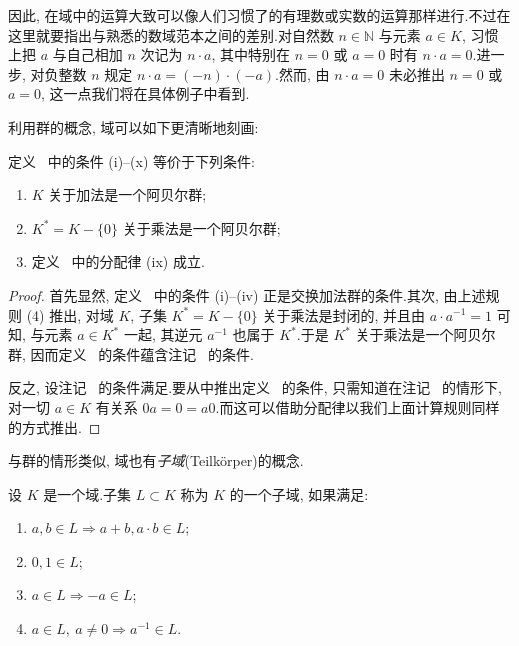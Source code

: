 因此, 在域中的运算大致可以像人们习惯了的有理数或实数的运算那样进行.不过在这里就要指出与熟悉的数域范本之间的差别.对自然数 $n \in \mathbb{N}$ 与元素 $a \in K$, 习惯上把 $a$ 与自己相加 $n$ 次记为 $n \cdot a$, 其中特别在 $n = 0$ 或 $a = 0$ 时有 $n \cdot a = 0$.进一步, 对负整数 $n$ 规定 $n \cdot a = (-n) \cdot (-a)$.然而, 由 $n \cdot a = 0$ 未必推出 $n = 0$ 或 $a = 0$, 这一点我们将在具体例子中看到.

利用群的概念, 域可以如下更清晰地刻画:

\begin{remark}[域的刻画]\label{rem:1.3.2}
定义~ 中的条件 (i)--(x) 等价于下列条件:
\begin{enumerate}
\item[(i)] $K$ 关于加法是一个阿贝尔群;
\item[(ii)] $K^* = K - \{0\}$ 关于乘法是一个阿贝尔群;
\item[(iii)] 定义~ 中的分配律 (ix) 成立.
\end{enumerate}
\end{remark}

\begin{proof}
首先显然, 定义~ 中的条件 (i)--(iv) 正是交换加法群的条件.其次, 由上述规则 (4) 推出, 对域 $K$, 子集 $K^* = K - \{0\}$ 关于乘法是封闭的, 并且由 $a \cdot a^{-1} = 1$ 可知, 与元素 $a \in K^*$ 一起, 其逆元 $a^{-1}$ 也属于 $K^*$.于是 $K^*$ 关于乘法是一个阿贝尔群, 因而定义~ 的条件蕴含注记~ 的条件.

反之, 设注记~ 的条件满足.要从中推出定义~ 的条件, 只需知道在注记~ 的情形下, 对一切 $a \in K$ 有关系 $0a = 0 = a0$.而这可以借助分配律以我们上面计算规则同样的方式推出.
\end{proof}

与群的情形类似, 域也有\emph{子域}(\textup{Teilkörper})的概念.

\begin{definition}[子域]\label{def:1.3.3}
设 $K$ 是一个域.子集 $L \subset K$ 称为 $K$ 的一个子域, 如果满足:
\begin{enumerate}
\item[(i)] $a, b \in L \Longrightarrow a + b, a \cdot b \in L$;
\item[(ii)] $0, 1 \in L$;
\item[(iii)] $a \in L \Longrightarrow -a \in L$;
\item[(iv)] $a \in L,\ a \neq 0 \Longrightarrow a^{-1} \in L$.
\end{enumerate}
\end{definition}


